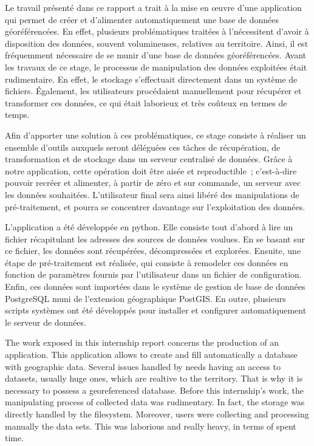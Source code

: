 
Le travail présenté dans ce rapport a trait à la mise en œuvre d'une application qui permet de créer et d'alimenter automatiquement une base de données géoréférencées. En effet, plusieurs problématiques traitées à l'\ifsttar nécessitent d'avoir à disposition des données, souvent volumineuses, relatives au territoire.  Ainsi, il est fréquemment nécessaire de se munir d'une base de données géoréférencées. Avant les travaux de ce stage, le processus de manipulation des données exploitées était rudimentaire. En effet, le stockage s'effectuait directement dans un système de fichiers. Également, les utilisateurs procédaient manuellement pour récupérer et transformer ces données, ce qui était laborieux et très coûteux en termes de temps.

Afin d'apporter une solution à ces problématiques, ce stage consiste à réaliser un ensemble d'outils auxquels seront déléguées ces tâches de récupération, de transformation et de stockage dans un serveur centralisé de données. Grâce à notre application, cette opération doit être aisée et reproductible~; c'est-à-dire pouvoir recréer et alimenter, à partir de zéro et sur commande, un serveur avec les données souhaitées. L'utilisateur final sera ainsi libéré des manipulations de pré-traitement, et pourra se concentrer davantage sur l'exploitation des données.

L'application a été développée en python. Elle consiste tout d'abord à lire un fichier récapitulant les adresses des sources de données voulues. En se basant sur ce fichier, les données sont récupérées, décompressées et explorées. Ensuite, une étape de pré-traitement est réalisée, qui consiste à remodeler ces données en fonction de paramètres fournis par l'utilisateur dans un fichier de configuration. Enfin, ces données sont importées dans le système de gestion de base de données PostgreSQL muni de l'extension géographique PostGIS. En outre, plusieurs scripts systèmes ont été développés pour installer et configurer automatiquement le serveur de données.


The work exposed in this internship report concerns the production of an application. This application allows to create and fill automatically a database with geographic data. Several issues handled by \ifsttar needs having an access to datasets, usually huge ones, which are realtive to the territory. That is why it is necessary to possess a georeferenced database. Before this internship's work, the manipulating process of collected data was rudimentary. In fact, the storage was directly handled by the filesystem. Moreover, users were collecting and processing manually the data sets. This was laborious and really heavy, in terms of spent time.

